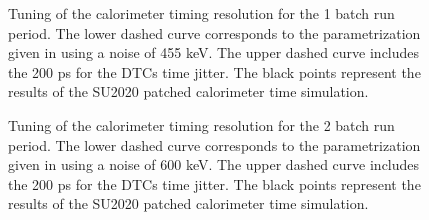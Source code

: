 \begin{figure}[h]
  \hspace{-0.6in}
  \caption{
    \label{fig:calorimeter_timing_resolution_1batch}
    Tuning of the calorimeter timing resolution for the 1 batch run period.
    The lower dashed curve corresponds to the parametrization given in 
    \cite{MU2E_36225_CALO_TIME_RES} using a noise of 455 keV.
    The upper dashed curve includes the 200 ps for the DTCs time jitter.
    The black points represent the results of the SU2020 patched calorimeter time simulation.
  }
\end{figure}

\begin{figure}[h]
  \hspace{-0.6in}
  \caption{
    \label{fig:calorimeter_timing_resolution_2batch}
    Tuning of the calorimeter timing resolution for the 2 batch run period.
    The lower dashed curve corresponds to the parametrization
    given in \cite{MU2E_36225_CALO_TIME_RES} using a noise of 600 keV.
    The upper dashed curve includes the 200 ps for the DTCs time jitter.
    The black points represent the results of the SU2020 patched calorimeter time simulation. 
  }
\end{figure}
